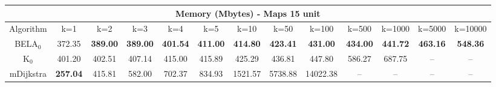 \begin{tabular}{c|cccccccccccc}\toprule
\multicolumn{13}{c}{Memory (Mbytes) - Maps 15 unit}\\ \midrule
Algorithm & k=1 & k=2 & k=3 & k=4 & k=5 & k=10 & k=50 & k=100 & k=500 & k=1000 & k=5000 & k=10000 \\ \midrule
BELA$_0$ & 372.35 & \textbf{389.00} & \textbf{389.00} & \textbf{401.54} & \textbf{411.00} & \textbf{414.80} & \textbf{423.41} & \textbf{431.00} & \textbf{434.00} & \textbf{441.72} & \textbf{463.16} & \textbf{548.36} \\
K$_0$ & 401.20 & 402.51 & 407.14 & 415.00 & 415.89 & 425.29 & 436.81 & 447.80 & 586.27 & 687.75 & -- & -- \\
mDijkstra & \textbf{257.04} & 415.81 & 582.00 & 702.37 & 834.93 & 1521.57 & 5738.88 & 14022.38 & -- & -- & -- & -- \\ \bottomrule 
\end{tabular}
